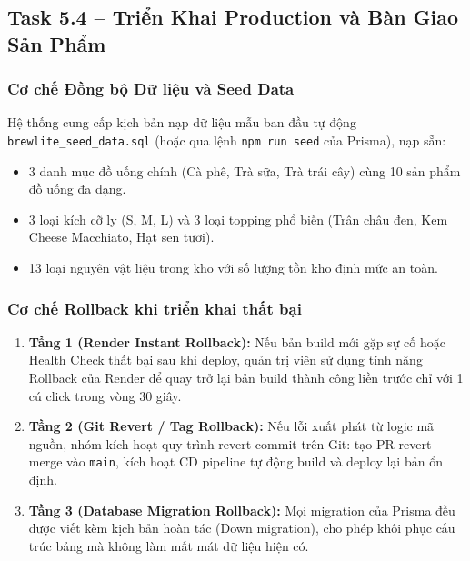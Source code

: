 \documentclass[11pt,a4paper]{article}
\begin{document}
\subsection{Task 5.4 -- Triển Khai Production và Bàn Giao Sản Phẩm}

\subsubsection{Cơ chế Đồng bộ Dữ liệu và Seed Data}
Hệ thống cung cấp kịch bản nạp dữ liệu mẫu ban đầu tự động \texttt{brewlite\_seed\_data.sql} (hoặc qua lệnh \texttt{npm run seed} của Prisma), nạp sẵn:
\begin{itemize}[leftmargin=*]
    \item 3 danh mục đồ uống chính (Cà phê, Trà sữa, Trà trái cây) cùng 10 sản phẩm đồ uống đa dạng.
    \item 3 loại kích cỡ ly (S, M, L) và 3 loại topping phổ biến (Trân châu đen, Kem Cheese Macchiato, Hạt sen tươi).
    \item 13 loại nguyên vật liệu trong kho với số lượng tồn kho định mức an toàn.
\end{itemize}
\clearpage

\subsubsection{Cơ chế Rollback khi triển khai thất bại}
\begin{enumerate}[leftmargin=*]
    \item \textbf{Tầng 1 (Render Instant Rollback):} Nếu bản build mới gặp sự cố hoặc Health Check thất bại sau khi deploy, quản trị viên sử dụng tính năng Rollback của Render để quay trở lại bản build thành công liền trước chỉ với 1 cú click trong vòng 30 giây.
    \item \textbf{Tầng 2 (Git Revert / Tag Rollback):} Nếu lỗi xuất phát từ logic mã nguồn, nhóm kích hoạt quy trình revert commit trên Git: tạo PR revert merge vào \texttt{main}, kích hoạt CD pipeline tự động build và deploy lại bản ổn định.
    \item \textbf{Tầng 3 (Database Migration Rollback):} Mọi migration của Prisma đều được viết kèm kịch bản hoàn tác (Down migration), cho phép khôi phục cấu trúc bảng mà không làm mất mát dữ liệu hiện có.
\end{enumerate}
\end{document}
